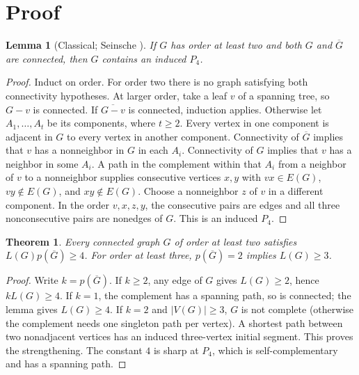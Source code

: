 \documentclass[11pt]{article}
\newtheorem{theorem}{Theorem}
\newtheorem{lemma}{Lemma}
\begin{document}
\section{Proof}
\begin{lemma}[Classical; Seinsche \cite{seinsche}]
If $G$ has order at least two and both $G$ and $\overline G$ are connected, then $G$ contains an induced $P_4$.
\end{lemma}
\begin{proof}
Induct on order. For order two there is no graph satisfying both connectivity hypotheses. At larger order, take a leaf $v$ of a spanning tree, so $G-v$ is connected. If $\overline{G-v}$ is connected, induction applies. Otherwise let $A_1,\ldots,A_t$ be its components, where $t\ge2$. Every vertex in one component is adjacent in $G$ to every vertex in another component. Connectivity of $\overline G$ implies that $v$ has a nonneighbor in $G$ in each $A_i$. Connectivity of $G$ implies that $v$ has a neighbor in some $A_i$. A path in the complement within that $A_i$ from a neighbor of $v$ to a nonneighbor supplies consecutive vertices $x,y$ with $vx\in E(G)$, $vy\notin E(G)$, and $xy\notin E(G)$. Choose a nonneighbor $z$ of $v$ in a different component. In the order $v,x,z,y$, the consecutive pairs are edges and all three nonconsecutive pairs are nonedges of $G$. This is an induced $P_4$.
\end{proof}
\begin{theorem}
Every connected graph $G$ of order at least two satisfies $L(G)p(\overline G)\ge4$. For order at least three, $p(\overline G)=2$ implies $L(G)\ge3$.
\end{theorem}
\begin{proof}
Write $k=p(\overline G)$. If $k\ge2$, any edge of $G$ gives $L(G)\ge2$, hence $kL(G)\ge4$. If $k=1$, the complement has a spanning path, so is connected; the lemma gives $L(G)\ge4$. If $k=2$ and $|V(G)|\ge3$, $G$ is not complete (otherwise the complement needs one singleton path per vertex). A shortest path between two nonadjacent vertices has an induced three-vertex initial segment. This proves the strengthening. The constant $4$ is sharp at $P_4$, which is self-complementary and has a spanning path.
\end{proof}
\end{document}

